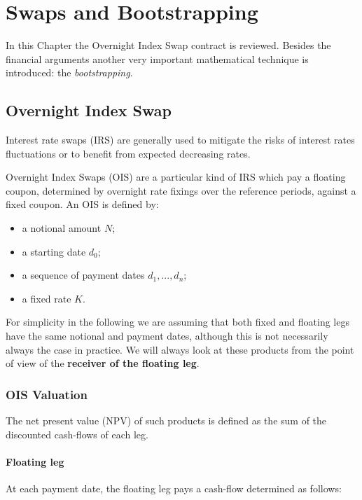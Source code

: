 \chapter{Swaps and Bootstrapping}
\label{sec:swaps-and-bootstrapping}

In this Chapter the Overnight Index Swap contract is reviewed. Besides the financial arguments another very important mathematical technique is introduced: the \emph{bootstrapping}.

\section{Overnight Index Swap}
\label{overnight-index-swap}

Interest rate swaps (IRS) are generally used to mitigate the risks of interest rates fluctuations or to benefit from expected decreasing rates.

Overnight Index Swaps (OIS) are a particular kind of IRS which pay a floating coupon, determined by overnight rate fixings over the reference periods, against a fixed coupon. An OIS is defined by:

\begin{itemize}
\tightlist
\item
  a notional amount $N$;
\item
  a starting date $d_0$;
\item
  a sequence of payment dates $d_1,...,d_n$;
\item
  a fixed rate $K$.
\end{itemize}

For simplicity in the following we are assuming that both fixed and floating legs have the same notional and payment dates, although this is not necessarily always the case in practice. We will always look at these products from the point of view of the \textbf{receiver of the floating leg}.

\subsection{OIS Valuation}\label{ois-valuation}
The net present value (NPV) of such products is defined as the sum of the discounted cash-flows of each leg.

\subsubsection{Floating leg}\label{floating-leg}
At each payment date, the floating leg pays a cash-flow determined as follows:

